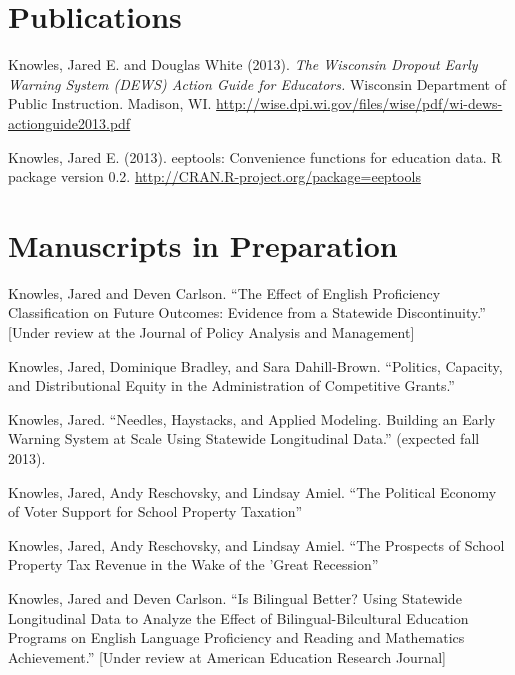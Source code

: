\documentclass[margin,line]{res}
\begin{document}
\begin{resume}
\vspace*{5mm}


\section{\sc Publications}

Knowles, Jared E. and Douglas White (2013). \emph{The Wisconsin Dropout Early Warning System (DEWS) Action Guide for Educators.} Wisconsin Department of Public Instruction. Madison, WI. \url{http://wise.dpi.wi.gov/files/wise/pdf/wi-dews-actionguide2013.pdf}

Knowles, Jared E. (2013). eeptools: Convenience functions for education data. R package
  version 0.2. \url{http://CRAN.R-project.org/package=eeptools}

\section{\sc Manuscripts in Preparation}

Knowles, Jared and Deven Carlson. ``The Effect of English Proficiency Classification on Future Outcomes: Evidence from a Statewide Discontinuity.'' [Under review at the 
Journal of Policy Analysis and Management]

Knowles, Jared, Dominique Bradley, and Sara Dahill-Brown. ``Politics, Capacity, and Distributional Equity in the Administration of Competitive Grants.''

Knowles, Jared. ``Needles, Haystacks, and Applied Modeling. Building an Early Warning System at Scale Using Statewide Longitudinal Data.'' (expected fall 2013). 

Knowles, Jared, Andy Reschovsky, and Lindsay Amiel. ``The Political Economy of Voter Support for School Property Taxation'' 

Knowles, Jared, Andy Reschovsky, and Lindsay Amiel. ``The Prospects of School Property Tax Revenue in the Wake of the 'Great Recession'' 

Knowles, Jared and Deven Carlson. ``Is Bilingual Better? Using Statewide Longitudinal Data to Analyze the Effect of Bilingual-Bilcultural Education Programs on English Language Proficiency and Reading and Mathematics Achievement.'' [Under review at American Education Research Journal]
% 
% 


\end{resume}
\end{document}
